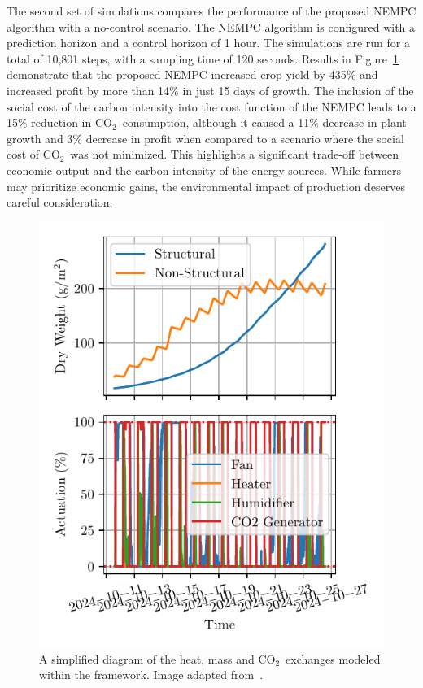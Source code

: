 \documentclass[conference]{IEEEtran}
\newcommand{\coo}{\ensuremath{\mathrm{CO_2}}}
\begin{document}
The second set of simulations compares the performance of the proposed NEMPC algorithm with a no-control scenario. The NEMPC algorithm is configured with a prediction horizon and a control horizon of 1 hour. The simulations are run for a total of 10,801 steps, with a sampling time of 120 seconds. Results in Figure~\ref{fig:control} demonstrate that the proposed NEMPC increased crop yield by 435\% and increased profit by more than 14\% in just 15 days of growth.
The inclusion of the social cost of the carbon intensity into the cost function of the NEMPC leads to a 15\% reduction in \coo\ consumption, although it caused a 11\% decrease in plant growth and 3\% decrease in profit when compared to a scenario where the social cost of \coo\ was not minimized. This highlights a significant trade-off between economic output and the carbon intensity of the energy sources. While farmers may prioritize economic gains, the environmental impact of production deserves careful consideration.

\begin{figure}\label{fig:control}
    \centering
    \includegraphics[width=\linewidth, trim=10 10 10 10]{figures/greenhouse_control-mpc_co2-N_30-steps_10801.pdf}
    \caption{A simplified diagram of the heat, mass and \coo\ exchanges modeled within the framework. Image adapted from~\cite{rmward61_2019}.}
\end{figure}
\end{document}

